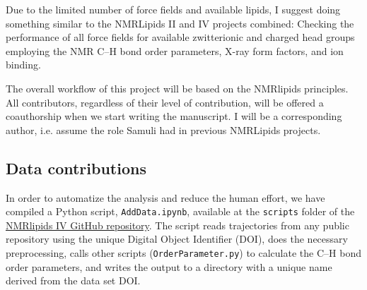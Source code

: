 \documentclass[journal=jpcbfk,manuscript=article,layout=twocolumn]{achemso}
\begin{document}
Due to the limited number of force fields and available lipids, I suggest
doing something similar to the NMRLipids II and IV projects combined: Checking
the performance of all force fields for available zwitterionic and charged head
groups employing the NMR C--H bond order parameters, X-ray form factors, and ion binding. %



The overall workflow of this project will be based on the NMRlipids principles. All contributors, regardless of their level of contribution, will be offered a coauthorship when we start writing the manuscript. I will be a corresponding author, i.e. assume the role Samuli had in previous NMRLipids projects.

\subsection{Data contributions}

In order to automatize the analysis and reduce the human effort, we have compiled a Python script, {\tt AddData.ipynb}, available at the {\tt scripts} folder of the \href{https://github.com/NMRLipids/NMRlipidsVIpolarizableFFs}{NMRlipids IV GitHub repository}. The script reads trajectories from any public repository using the unique Digital Object Identifier (DOI), does the necessary preprocessing, calls other scripts ({\tt Order\-Parameter.py}) %
to calculate the C--H bond order parameters, %
and writes the output to a directory with a unique name derived from the data set DOI.
\end{document}
